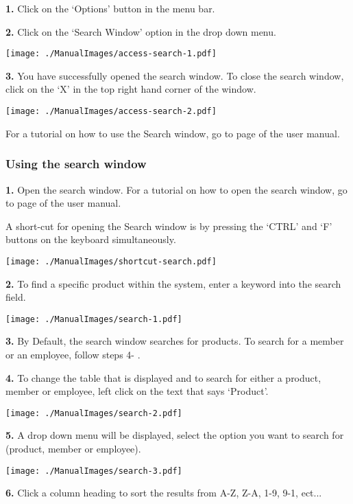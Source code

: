 \textbf{1.} Click on the `Options' button in the menu bar.

\textbf{2.} Click on the `Search Window' option in the drop down menu.

\texttt{[image: ./ManualImages/access-search-1.pdf]}

\pagebreak

\textbf{3.} You have successfully opened the search window. To close the search window, click on the `X' in the top right hand corner of the window.

\texttt{[image: ./ManualImages/access-search-2.pdf]}

For a tutorial on how to use the Search window, go to page \pageref{fig:Using the search window} of the user manual.


\pagebreak
\subsubsection{Using the search window}
\label{fig:Using the search window}

\textbf{1.} Open the search window. For a tutorial on how to open the search window, go to page \pageref{fig:Accessing the search window} of the user manual.

A short-cut for opening the Search window is by pressing the `CTRL' and `F' buttons on the keyboard simultaneously.

\texttt{[image: ./ManualImages/shortcut-search.pdf]}

\textbf{2.} To find a specific product within the system, enter a keyword into the search field.

\texttt{[image: ./ManualImages/search-1.pdf]}

\textbf{3.} By Default, the search window searches for products. To search for a member or an employee, follow steps 4- .

\textbf{4.} To change the table that is displayed and to search for either a product, member or employee, left click on the text that says `Product'.

\texttt{[image: ./ManualImages/search-2.pdf]}

\textbf{5.} A drop down menu will be displayed, select the option you want to search for (product, member or employee).

\texttt{[image: ./ManualImages/search-3.pdf]}

\textbf{6.} Click a column heading to sort the results from A-Z, Z-A, 1-9, 9-1, ect...

